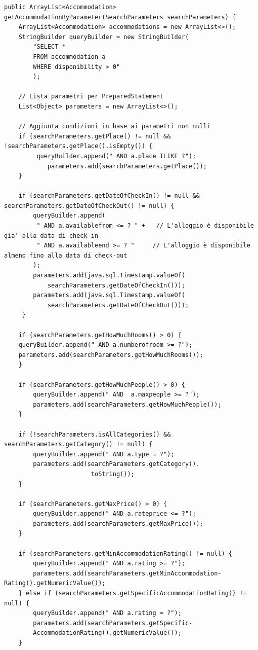 \documentclass[10pt]{article}
\begin{document}
\begin{lstlisting}
public ArrayList<Accommodation> getAccommodationByParameter(SearchParameters searchParameters) {
    ArrayList<Accommodation> accommodations = new ArrayList<>();
    StringBuilder queryBuilder = new StringBuilder(
        "SELECT * 
        FROM accommodation a 
        WHERE disponibility > 0"
        );

    // Lista parametri per PreparedStatement
    List<Object> parameters = new ArrayList<>();

    // Aggiunta condizioni in base ai parametri non nulli
    if (searchParameters.getPlace() != null && !searchParameters.getPlace().isEmpty()) {
         queryBuilder.append(" AND a.place ILIKE ?");
            parameters.add(searchParameters.getPlace());
    }

    if (searchParameters.getDateOfCheckIn() != null && searchParameters.getDateOfCheckOut() != null) {
        queryBuilder.append(
         " AND a.availablefrom <= ? " +   // L'alloggio è disponibile gia' alla data di check-in
         " AND a.availableend >= ? "     // L'alloggio è disponibile almeno fino alla data di check-out
        );
        parameters.add(java.sql.Timestamp.valueOf(
            searchParameters.getDateOfCheckIn()));
        parameters.add(java.sql.Timestamp.valueOf(
            searchParameters.getDateOfCheckOut()));
     }

    if (searchParameters.getHowMuchRooms() > 0) {
    queryBuilder.append(" AND a.numberofroom >= ?");
    parameters.add(searchParameters.getHowMuchRooms());
    }

    if (searchParameters.getHowMuchPeople() > 0) {
        queryBuilder.append(" AND  a.maxpeople >= ?");
        parameters.add(searchParameters.getHowMuchPeople());
    }

    if (!searchParameters.isAllCategories() && searchParameters.getCategory() != null) {
        queryBuilder.append(" AND a.type = ?");
        parameters.add(searchParameters.getCategory().
                        toString());
    }

    if (searchParameters.getMaxPrice() > 0) {
        queryBuilder.append(" AND a.rateprice <= ?");
        parameters.add(searchParameters.getMaxPrice());
    }

    if (searchParameters.getMinAccommodationRating() != null) {
        queryBuilder.append(" AND a.rating >= ?");
        parameters.add(searchParameters.getMinAccommodation-                Rating().getNumericValue());
    } else if (searchParameters.getSpecificAccommodationRating() !=             null) {
        queryBuilder.append(" AND a.rating = ?");
        parameters.add(searchParameters.getSpecific-
        AccommodationRating().getNumericValue());
    }


\end{lstlisting}
\end{document}
